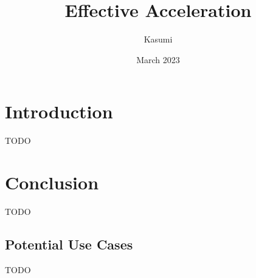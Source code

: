 \documentclass{article}
\title{Effective Acceleration}
\author{Kasumi}
\date{March 2023}
\begin{document}
\maketitle

\section{Introduction}

TODO

\section{Conclusion}

TODO

\printbibliography{}

\newpage

\begin{appendices}

\section{Potential Use Cases}

TODO

\end{appendices}
\end{document}

